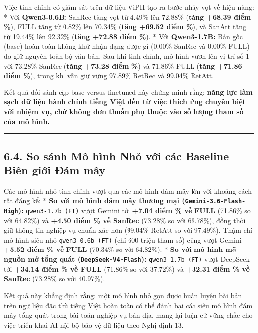 \documentclass[
  11pt,
  a4paper,
]{article}
\begin{document}
Việc tinh chỉnh có giám sát trên dữ liệu ViPII tạo ra bước nhảy vọt về hiệu năng: * Với
\textbf{Qwen3-0.6B:} SanRec tăng vọt từ 4.49\% lên 72.88\% (\textbf{tăng +68.39 điểm \%}), FULL tăng
từ 0.82\% lên 70.34\% (\textbf{tăng +69.52 điểm \%}), và SanAtt tăng từ 19.44\% lên 92.32\%
(\textbf{tăng +72.88 điểm \%}). * Với \textbf{Qwen3-1.7B:} Bản gốc (base) hoàn toàn không khử nhận
dạng được gì (0.00\% SanRec và 0.00\% FULL) do giữ nguyên toàn bộ văn bản. Sau khi tinh chỉnh, mô
hình vươn lên vị trí số 1 với 73.28\% SanRec (\textbf{tăng +73.28 điểm \%}) và 71.86\% FULL
(\textbf{tăng +71.86 điểm \%}), trong khi vẫn giữ vững 97.89\% RetRec và 99.04\% RetAtt.

Kết quả đối sánh cặp base-versus-finetuned này chứng minh rằng: \textbf{năng lực làm sạch dữ liệu
hành chính tiếng Việt đến từ việc thích ứng chuyên biệt với nhiệm vụ, chứ không đơn thuần phụ thuộc
vào số lượng tham số của mô hình.}

\begin{center}\rule{0.5\linewidth}{0.5pt}\end{center}

\subsection{6.4. So sánh Mô hình Nhỏ với các Baseline Biên giới Đám
mây}\label{so-suxe1nh-muxf4-huxecnh-nhux1ecf-vux1edbi-cuxe1c-baseline-biuxean-giux1edbi-ux111uxe1m-muxe2y}

Các mô hình nhỏ tinh chỉnh vượt qua các mô hình đám mây lớn với khoảng cách rất đáng kể: *
\textbf{So với mô hình đám mây thương mại (\texttt{Gemini-3.6-Flash-High}):}
\texttt{qwen3-1.7b\ (FT)} vượt Gemini tới \textbf{+7.04 điểm \% về FULL} (71.86\% so với 64.82\%) và
\textbf{+4.50 điểm \% về SanRec} (73.28\% so với 68.78\%), đồng thời giữ thông tin nghiệp vụ chuẩn
xác hơn (99.04\% RetAtt so với 97.49\%). Thậm chí mô hình siêu nhỏ \texttt{qwen3-0.6b\ (FT)} (chỉ
600 triệu tham số) cũng vượt Gemini \textbf{+5.52 điểm \% về FULL} (70.34\% so với 64.82\%). *
\textbf{So với mô hình mã nguồn mở tổng quát (\texttt{DeepSeek-V4-Flash}):}
\texttt{qwen3-1.7b\ (FT)} vượt DeepSeek tới \textbf{+34.14 điểm \% về FULL} (71.86\% so với 37.72\%)
và \textbf{+32.31 điểm \% về SanRec} (73.28\% so với 40.97\%).

Kết quả này khẳng định rằng: một mô hình nhỏ gọn được huấn luyện bài bản trên ngữ liệu đặc thù tiếng
Việt hoàn toàn có thể đánh bại các siêu mô hình đám mây tổng quát trong bài toán nghiệp vụ bản địa,
mang lại luận cứ vững chắc cho việc triển khai AI nội bộ bảo vệ dữ liệu theo Nghị định 13.
\end{document}
